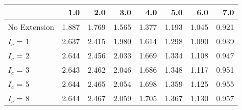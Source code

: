 \begin{tabular}{lrrrrrrr}
\toprule
{} &   1.0 &   2.0 &   3.0 &   4.0 &   5.0 &   6.0 &   7.0 \\
\midrule
No Extension & 1.887 & 1.769 & 1.565 & 1.377 & 1.193 & 1.045 & 0.921 \\
$I_c$ = 1    & 2.637 & 2.415 & 1.980 & 1.614 & 1.298 & 1.090 & 0.939 \\
$I_c$ = 2    & 2.644 & 2.456 & 2.033 & 1.669 & 1.334 & 1.108 & 0.947 \\
$I_c$ = 3    & 2.643 & 2.462 & 2.046 & 1.686 & 1.348 & 1.117 & 0.951 \\
$I_c$ = 5    & 2.644 & 2.465 & 2.054 & 1.698 & 1.359 & 1.125 & 0.955 \\
$I_c$ = 8    & 2.644 & 2.467 & 2.059 & 1.705 & 1.367 & 1.130 & 0.957 \\
\bottomrule
\end{tabular}
